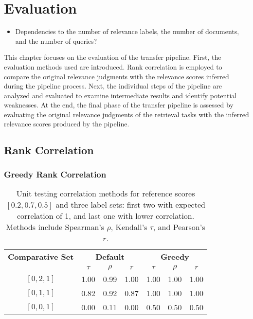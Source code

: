 \chapter{Evaluation}\label{evaluation}

\begin{itemize}
    \item Dependencies to the number of relevance labels, the number of documents, and the number of queries?
\end{itemize}

This chapter focuses on the evaluation of the transfer pipeline. First, the evaluation methods used are introduced. Rank correlation is employed to compare the original relevance judgments with the relevance scores inferred during the pipeline process. Next, the individual steps of the pipeline are analyzed and evaluated to examine intermediate results and identify potential weaknesses. At the end, the final phase of the transfer pipeline is assessed by evaluating the original relevance judgments of the retrieval tasks with the inferred relevance scores produced by the pipeline.

\section{Rank Correlation}\label{rank-correlation}

\subsection{Greedy Rank Correlation}\label{greedy-rank-correlation}

\begin{table}[t]
    \centering
    \caption{
        Unit testing correlation methods for reference scores $[0.2, 0.7, 0.5]$ and three label sets: first two with expected correlation of 1, and last one with lower correlation. Methods include Spearman's $\rho$, Kendall's $\tau$, and Pearson's $r$.
    }
    \begin{tabular}{ccccccc}
        \toprule
        \textbf{Comparative Set} & \multicolumn{3}{c}{\textbf{Default}} & \multicolumn{3}{c}{\textbf{Greedy}} \\
        \cmidrule(lr){2-4} \cmidrule(lr){5-7}
                                 & $\tau$ & $\rho$ & $r$ & $\tau$ & $\rho$ & $r$ \\
        \midrule
        
        $[0, 2, 1]$ & 1.00 & 0.99 & 1.00 & 1.00  & 1.00  & 1.00 \\
        $[0, 1, 1]$ & 0.82 & 0.92 & 0.87 & 1.00  & 1.00  & 1.00 \\
        $[0, 0, 1]$ & 0.00 & 0.11 & 0.00 & 0.50  & 0.50  & 0.50 \\
        \bottomrule
    \end{tabular}
\end{table}

